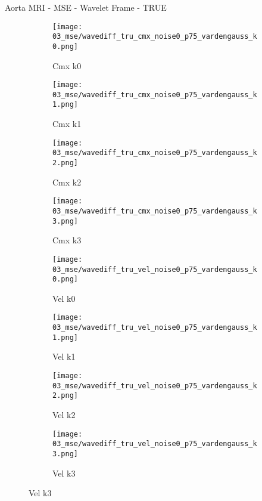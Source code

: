 \documentclass{beamer}
\begin{document}
\begin{frame}{Aorta MRI - MSE - Wavelet Frame - TRUE}{}
\begin{figure}
\begin{subfigure}{0.24\textwidth}
\texttt{[image: 03\_mse/wavediff\_tru\_cmx\_noise0\_p75\_vardengauss\_k0.png]}
\vspace{-20pt}
\caption*{\tiny Cmx k0}
\end{subfigure}
\begin{subfigure}{0.24\textwidth}
\texttt{[image: 03\_mse/wavediff\_tru\_cmx\_noise0\_p75\_vardengauss\_k1.png]}
\vspace{-20pt}
\caption*{\tiny Cmx k1}
\end{subfigure}
\begin{subfigure}{0.24\textwidth}
\texttt{[image: 03\_mse/wavediff\_tru\_cmx\_noise0\_p75\_vardengauss\_k2.png]}
\vspace{-20pt}
\caption*{\tiny Cmx k2}
\end{subfigure}
\begin{subfigure}{0.24\textwidth}
\texttt{[image: 03\_mse/wavediff\_tru\_cmx\_noise0\_p75\_vardengauss\_k3.png]}
\vspace{-20pt}
\caption*{\tiny Cmx k3}
\end{subfigure}

\begin{subfigure}{0.24\textwidth}
\texttt{[image: 03\_mse/wavediff\_tru\_vel\_noise0\_p75\_vardengauss\_k0.png]}
\vspace{-20pt}
\caption*{\tiny Vel k0}
\end{subfigure}
\begin{subfigure}{0.24\textwidth}
\texttt{[image: 03\_mse/wavediff\_tru\_vel\_noise0\_p75\_vardengauss\_k1.png]}
\vspace{-20pt}
\caption*{\tiny Vel k1}
\end{subfigure}
\begin{subfigure}{0.24\textwidth}
\texttt{[image: 03\_mse/wavediff\_tru\_vel\_noise0\_p75\_vardengauss\_k2.png]}
\vspace{-20pt}
\caption*{\tiny Vel k2}
\end{subfigure}
\begin{subfigure}{0.24\textwidth}
\texttt{[image: 03\_mse/wavediff\_tru\_vel\_noise0\_p75\_vardengauss\_k3.png]}
\vspace{-20pt}
\caption*{\tiny Vel k3}
\end{subfigure}
\end{figure}
\end{frame}
\end{document}
